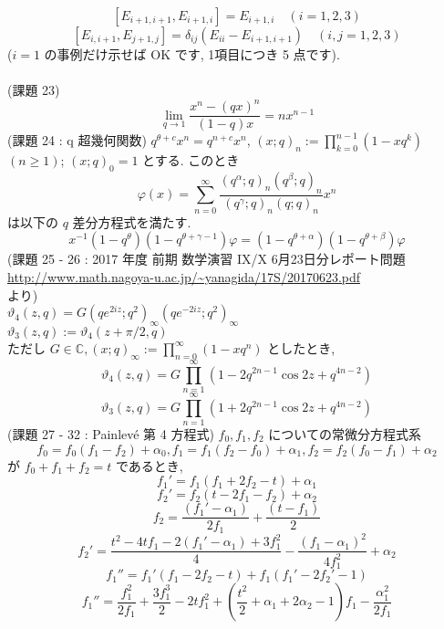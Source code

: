 \documentclass{article}
\begin{document}
\[ [E_{i+1,i+1}, E_{i+1,i}] = E_{i+1,i} \quad (i=1,2,3) \]
\[ [E_{i,i+1}, E_{j+1,j}] = \delta_{ij} (E_{ii} - E_{i+1,i+1}) \quad (i,j=1,2,3) \]
($i=1$ の事例だけ示せば OK です, 1項目につき 5 点です).\\\\
(課題 23)
\[ \lim_{q \to 1} \frac{x^n - (qx)^n}{(1 - q)x} = nx^{n-1} \]
\newpage \noindent
(課題 24 : q 超幾何関数) $q^{\theta+c}x^n = q^{n+c}x^n$, $(x;q)_{n} := \prod^{n-1}_{k=0}(1-xq^k)$ $(n \geq 1)$; $(x;q)_0=1$ とする. このとき
\[ \varphi(x) = \sum^{\infty}_{n=0} \frac{(q^{\alpha};q)_n(q^{\beta};q)_n}{(q^{\gamma};q)_n(q;q)_n}x^n \]
は以下の $q$ 差分方程式を満たす.
\[ x^{-1}(1-q^{\theta})(1-q^{\theta+\gamma-1})\varphi = (1-q^{\theta+\alpha})(1-q^{\theta+\beta})\varphi \]
(課題 25 - 26 : 2017 年度 前期 数学演習 IX/X 6月23日分レポート問題\\
\url{http://www.math.nagoya-u.ac.jp/~yanagida/17S/20170623.pdf}\\
より)\\
$\vartheta_4(z,q) = G(qe^{2iz};q^2)_{\infty}(qe^{-2iz};q^2)_{\infty}$\\
$\vartheta_3(z,q) := \vartheta_4(z+\pi/2,q)$\\
ただし $G \in \mathbb{C}, (x;q)_{\infty} := \prod^{\infty}_{n=0} (1 - xq^n)$ としたとき,
\[ \vartheta_4(z,q) = G \prod^{\infty}_{n=1}(1-2q^{2n-1}\cos{2z}+q^{4n-2}) \]
\[ \vartheta_3(z,q) = G \prod^{\infty}_{n=1}(1+2q^{2n-1}\cos{2z}+q^{4n-2}) \]
(課題 27 - 32 : Painlev\'e 第 4 方程式) $f_0,f_1,f_2$ についての常微分方程式系
\[ f_0 = f_0(f_1-f_2)+\alpha_0, f_1 = f_1(f_2-f_0)+\alpha_1, f_2 = f_2(f_0-f_1)+\alpha_2 \]
が $f_0 + f_1 + f_2 = t$ であるとき, 
\[ f_1' = f_1(f_1 + 2f_2- t) + \alpha_1 \]
\[ f_2' = f_2(t - 2f_1 - f_2) + \alpha_2 \]
\[ f_2 = \frac{(f_1' - \alpha_1)}{2f_1} + \frac{(t-f_1)}{2} \]
\[ f_2' = \frac{t^2 - 4tf_1 - 2(f_1' - \alpha_1) + 3f_1^2}{4} - \frac{(f_1 - \alpha_1)^2}{4f_1^2} + \alpha_2 \]
\[ f_1'' = f_1'(f_1 - 2f_2 - t) + f_1(f_1' - 2f_2' - 1) \]
\[ f_1'' = \frac{f_1^2}{2f_1} + \frac{3f_1^3}{2} - 2tf_1^2 + \left(\frac{t^2}{2} + \alpha_1 + 2\alpha_2 - 1 \right)f_1 - \frac{\alpha_1^2}{2f_1} \]
\end{document}
